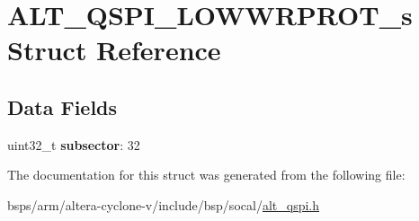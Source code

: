 \hypertarget{structALT__QSPI__LOWWRPROT__s}{}\section{A\+L\+T\+\_\+\+Q\+S\+P\+I\+\_\+\+L\+O\+W\+W\+R\+P\+R\+O\+T\+\_\+s Struct Reference}
\label{structALT__QSPI__LOWWRPROT__s}
\subsection*{Data Fields}
\begin{DoxyCompactItemize}
\item 
\mbox{\label{structALT__QSPI__LOWWRPROT__s_a09551ec10e78a052724728a45978a9ae}} 
uint32\+\_\+t {\bfseries subsector}\+: 32
\end{DoxyCompactItemize}


The documentation for this struct was generated from the following file\+:\begin{DoxyCompactItemize}
\item 
bsps/arm/altera-\/cyclone-\/v/include/bsp/socal/\mbox{\hyperlink{include_2bsp_2socal_2alt__qspi_8h}{alt\+\_\+qspi.\+h}}\end{DoxyCompactItemize}
